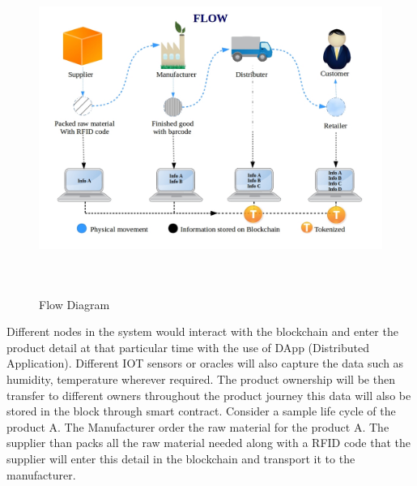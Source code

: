 \documentclass[12pt]{article}
\begin{document}
\vspace{\baselineskip}



\begin{figure}[H]
	\begin{Center}
		\includegraphics[width=5.99in,height=4.24in]{.//media/1.jpg}
		\caption{Flow Diagram}
	\end{Center}
\end{figure}




\begin{justify}
{\fontsize{14pt}{16.8pt}\selectfont Different nodes in the system would interact with the blockchain and enter the product detail at that particular time with the use of DApp (Distributed Application). Different IOT sensors or oracles will also capture the data such as humidity, temperature wherever required. The product ownership will be then transfer to different owners throughout the product journey this data will also be stored in the block through smart contract. Consider a sample life cycle of the product A. The Manufacturer order the raw material for the product A. The supplier than packs all the raw material needed along with a RFID code that the supplier will enter this detail in the blockchain and transport it to the manufacturer.\par}
\end{justify}\par
\end{document}
